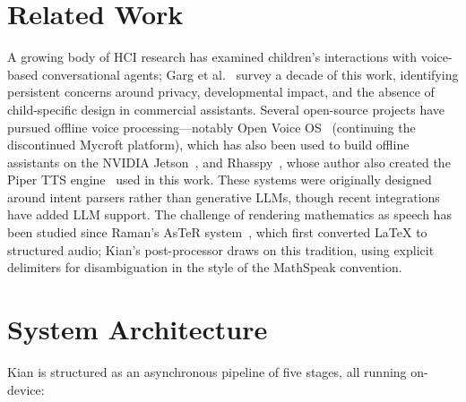 \documentclass[11pt]{article}
\begin{document}
\section{Related Work}

A growing body of HCI research has examined children's interactions with voice-based conversational agents;
Garg et al.~\cite{garg2022last} survey a decade of this work,
identifying persistent concerns around privacy, developmental impact, and the absence of child-specific design in commercial assistants.
Several open-source projects have pursued offline voice processing---notably
Open Voice OS~\cite{ovos} (continuing the discontinued Mycroft platform),
which has also been used to build offline assistants on the NVIDIA Jetson~\cite{ovos_jetson},
and Rhasspy~\cite{rhasspy}, whose author also created the Piper TTS engine~\cite{piper_tts} used in this work.
These systems were originally designed around intent parsers rather than generative LLMs,
though recent integrations have added LLM support.
The challenge of rendering mathematics as speech has been studied since Raman's AsTeR system~\cite{raman1998audio},
which first converted \LaTeX{} to structured audio;
Kian's post-processor draws on this tradition,
using explicit delimiters for disambiguation in the style of the MathSpeak convention.

\section{System Architecture}

Kian is structured as an asynchronous pipeline of five stages, all running on-device:
\end{document}
